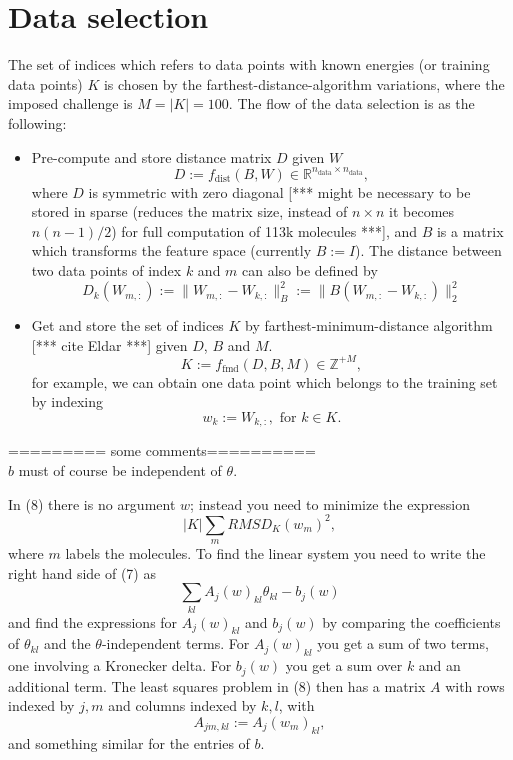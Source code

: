 \documentclass[12pt]{article}
\def\att{                    %
        \marginpar[ \hspace*{\fill} \raisebox{-0.2em}{\rule{2mm}{1.2em}} ]
        {\raisebox{-0.2em}{\rule{2mm}{1.2em}} }
        }
\def\at#1{[*** \att #1 ***]}  %
\begin{document}
\section{Data selection}
The set of indices which refers to data points with known energies (or training data points) $K$ is chosen by the farthest-distance-algorithm variations, where the imposed challenge is $M = |K| = 100$. The flow of the data selection is as the following:
\begin{itemize}
	\item Pre-compute and store distance matrix $D$ given $W$
	\begin{equation}
		D := f_{\text{dist}}(B, W) \in \mathbb{R}^{n_\text{data} \times n_\text{data}},
	\end{equation}
	where $D$ is symmetric with zero diagonal \at{might be necessary to be stored in sparse (reduces the matrix size, instead of $n \times n$ it becomes $n(n-1)/2$) for full computation of 113k molecules}, and $B$ is a matrix which transforms the feature space (currently $B := I$). The distance between two data points of index $k$ and $m$ can also be defined by
	\begin{equation}
		D_k(W_{m,:}) := \|W_{m,:} - W_{k,:}\|^2_B := \|B(W_{m,:} - W_{k,:})\|^2_2
	\end{equation}
	\item Get and store the set of indices $K$ by farthest-minimum-distance algorithm \at{cite Eldar} given $D$, $B$ and $M$.
	\begin{equation}
		K := f_{\text{fmd}}(D, B, M) \in \mathbb{Z}^{+M},
	\end{equation}
	for example, we can obtain one data point which belongs to the training set by indexing
	\begin{equation}
		w_k := W_{k,:}, \text{ for } k \in K.
	\end{equation}
	
\end{itemize}




\iffalse
========= some comments========== \\
$b$ must of course be independent of $\theta$.

In (8) there is no argument $w$; instead you need to minimize the expression
\begin{equation}
    |K| \sum_m RMSD_K(w_m)^2,
\end{equation}
where $m$ labels the molecules. To find the linear system you need to write the right hand side of (7) as
\begin{equation}
    \sum_{kl} A_j(w)_{kl} \theta_{kl} -b_j(w)
\end{equation}
and find the expressions for $A_j(w)_{kl}$ and $b_j(w)$ by comparing the coefficients of $\theta_{kl}$ and the $\theta$-independent terms. For $A_j(w)_{kl}$ you get a sum of two terms, one involving a Kronecker delta. For $b_j(w)$ you get a sum over $k$ and an additional term.
The least squares problem in (8) then has a matrix $A$ with rows indexed by $j,m$ and columns indexed by $k,l$, with
\begin{equation}
    A_{jm,kl}:=A_j(w_m)_{kl},
\end{equation}
and something similar for the entries of $b$.
\end{document}
